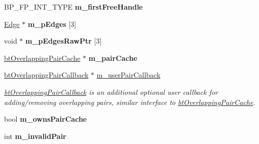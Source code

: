 \begin{DoxyCompactItemize}
\item 
\hypertarget{classbt_axis_sweep3_internal_ae101ad664a9632021ca498894ebc046e}{B\+P\+\_\+\+F\+P\+\_\+\+I\+N\+T\+\_\+\+T\+Y\+P\+E {\bfseries m\+\_\+first\+Free\+Handle}}\label{classbt_axis_sweep3_internal_ae101ad664a9632021ca498894ebc046e}

\item 
\hypertarget{classbt_axis_sweep3_internal_a1266c6a2b447143e6b5ea94400d6d885}{\hyperlink{classbt_axis_sweep3_internal_1_1_edge}{Edge} $\ast$ {\bfseries m\+\_\+p\+Edges} \mbox{[}3\mbox{]}}\label{classbt_axis_sweep3_internal_a1266c6a2b447143e6b5ea94400d6d885}

\item 
\hypertarget{classbt_axis_sweep3_internal_aa561e1ee29af23667eb4a0ff11c30784}{void $\ast$ {\bfseries m\+\_\+p\+Edges\+Raw\+Ptr} \mbox{[}3\mbox{]}}\label{classbt_axis_sweep3_internal_aa561e1ee29af23667eb4a0ff11c30784}

\item 
\hypertarget{classbt_axis_sweep3_internal_a09d00e46ae80be8dfbbba27a8b8a0924}{\hyperlink{classbt_overlapping_pair_cache}{bt\+Overlapping\+Pair\+Cache} $\ast$ {\bfseries m\+\_\+pair\+Cache}}\label{classbt_axis_sweep3_internal_a09d00e46ae80be8dfbbba27a8b8a0924}

\item 
\hypertarget{classbt_axis_sweep3_internal_ad26657cfc4245f099042178daf885563}{\hyperlink{classbt_overlapping_pair_callback}{bt\+Overlapping\+Pair\+Callback} $\ast$ \hyperlink{classbt_axis_sweep3_internal_ad26657cfc4245f099042178daf885563}{m\+\_\+user\+Pair\+Callback}}\label{classbt_axis_sweep3_internal_ad26657cfc4245f099042178daf885563}

\begin{DoxyCompactList}\small\item\em \hyperlink{classbt_overlapping_pair_callback}{bt\+Overlapping\+Pair\+Callback} is an additional optional user callback for adding/removing overlapping pairs, similar interface to \hyperlink{classbt_overlapping_pair_cache}{bt\+Overlapping\+Pair\+Cache}. \end{DoxyCompactList}\item 
\hypertarget{classbt_axis_sweep3_internal_a4ae7463e32030034f503bd6f32835108}{bool {\bfseries m\+\_\+owns\+Pair\+Cache}}\label{classbt_axis_sweep3_internal_a4ae7463e32030034f503bd6f32835108}

\item 
\hypertarget{classbt_axis_sweep3_internal_a6ecb6f04fd6ed4e84f99b0e934615537}{int {\bfseries m\+\_\+invalid\+Pair}}\label{classbt_axis_sweep3_internal_a6ecb6f04fd6ed4e84f99b0e934615537}


\end{DoxyCompactItemize}
